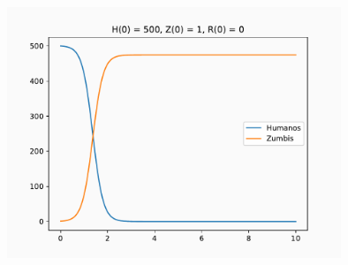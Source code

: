 \documentclass[xcolor=dvipsnames, aspectratio=169]{beamer}
\begin{document}
    \begin{frame}
        \begin{center}
            \includegraphics[width=0.75\textwidth]{4.pdf}
        \end{center}
    \end{frame}
    \begin{frame}
        \nocite{*}
        \printbibliography
    \end{frame}
\end{document}

